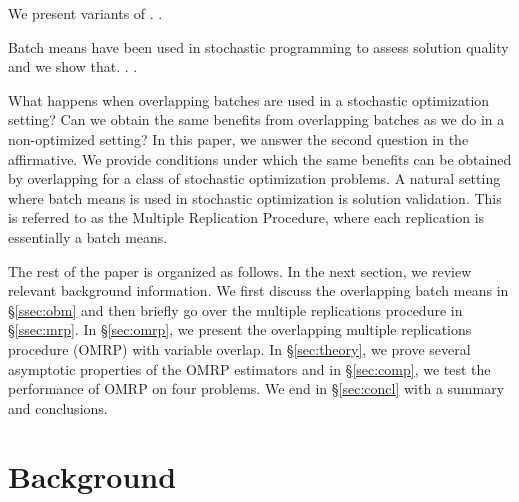 \documentclass[12pt]{article}
\begin{document}

\bigskip 

 We present variants of . .  

\bigskip 

Batch means have been used in stochastic programming to assess solution quality and we show that. . . 
\bigskip 


What happens when overlapping batches are used in a stochastic optimization setting?  Can we obtain the same benefits from overlapping batches as we do in a non-optimized setting?  In this paper, we answer the second question in the affirmative. We provide conditions under which the same benefits can be obtained by overlapping for a class of stochastic optimization problems. A natural setting where batch means is used in stochastic optimization is solution validation. This is referred to as the Multiple Replication Procedure, where each replication is essentially a batch means.  

\bigskip 



The rest of the paper is organized as follows.  
In the next section, we review relevant background information.  
We first discuss the overlapping batch means in \S \ref{ssec:obm} and then briefly go over the multiple replications procedure in \S \ref{ssec:mrp}.  
In \S \ref{sec:omrp}, we present the overlapping multiple replications procedure (OMRP) with variable overlap.  
In \S \ref{sec:theory}, we prove several asymptotic properties of the OMRP estimators and in \S \ref{sec:comp}, we test the performance of OMRP on four problems.  
We end in \S \ref{sec:concl} with a summary and conclusions.

\section{Background}
\label{sec:background}
\end{document}
